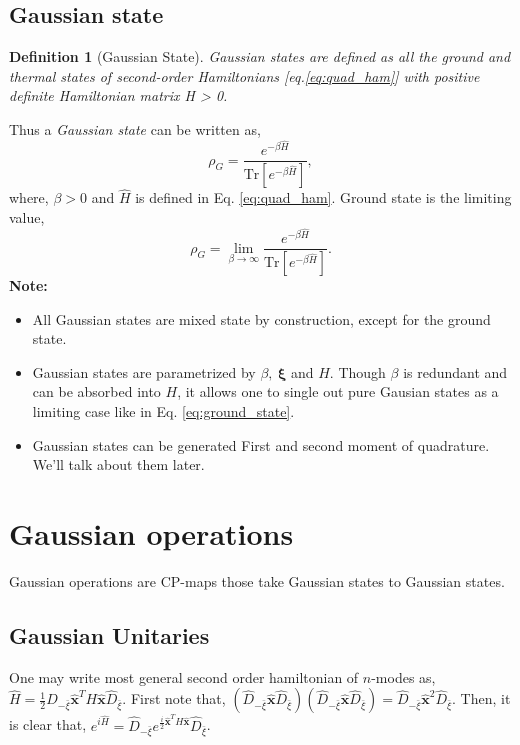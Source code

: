 \documentclass[english,10pt,a4paper]{article}
\newtheorem{definition}{Definition}
\newcommand{\xx}{\hat{\textbf{x}}}
\newcommand{\dd}[1]{\hat{D}_{#1}}
\newcommand{\half}{\frac{1}{2}}
\newcommand{\tr}[1]{\text{Tr}\left[{#1}\right]}
\begin{document}
	\subsection{Gaussian state}
	\begin{definition}[Gaussian State]
		Gaussian states are defined as all the ground and thermal states of second-order Hamiltonians [eq.\ref{eq:quad_ham}] with positive definite Hamiltonian matrix H > 0.
	\end{definition}
	Thus a \textit{Gaussian state} can be written as,
	\begin{equation}
		\label{eq:gaussian_state}
		\rho_G = \frac{e^{-\beta \hat{H}}}{\tr{e^{-\beta \hat{H}}}},
	\end{equation}
	where, $\beta >0$ and $\hat{H}$ is defined in Eq. \ref{eq:quad_ham}. Ground state is the limiting value,
	\begin{equation}
		\label{eq:ground_state}
		\rho_G = \lim_{\beta\to \infty} \frac{e^{-\beta \hat{H}}}{\tr{e^{-\beta \hat{H}}}}.
	\end{equation}
	\textbf{Note:}
	\begin{itemize}
		\item All Gaussian states are mixed state by construction, except for the ground state.
		\item Gaussian states are parametrized by $\beta,\ \mathbf{\xi}$ and $H$. Though $\beta$ is redundant and can be absorbed into $H$, it allows one to single out pure Gausian states as a limiting case like in Eq. \ref{eq:ground_state}. 
		\item Gaussian states can be generated First and second moment of quadrature. We'll talk about them later.
	\end{itemize}
	
	\section{Gaussian operations}
	Gaussian operations are CP-maps those take Gaussian states to Gaussian states.
	\subsection{Gaussian Unitaries}
	One may write most general second order hamiltonian of $n$-modes as, $\hat{H}=\half \dd{-\bar{\xi}} \xx^T H \xx \dd{\bar{\xi}} $.
	First note that, $(\dd{-\bar{\xi}} \xx \dd{\bar{\xi}}) (\dd{-\bar{\xi}} \xx \dd{\bar{\xi}}) = \dd{-\bar{\xi}} \xx^2 \dd{\bar{\xi}}$. Then, 
	it is clear that, $ e^{i\hat{H}} =  \dd{-\bar{\xi}} e^{\frac{i}{2}\xx^T H \xx } \dd{\bar{\xi}}$.
\end{document}
